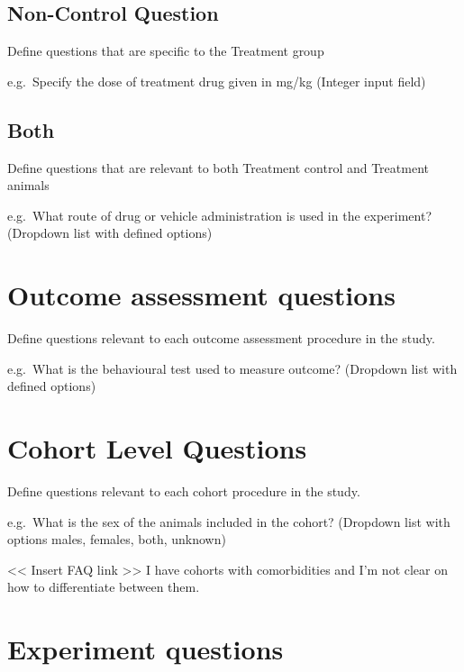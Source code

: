 \documentclass[
]{book}
\begin{document}
\hypertarget{non-control-question-1}{%
\subsection{Non-Control Question}\label{non-control-question-1}}

Define questions that are specific to the Treatment group

e.g.~Specify the dose of treatment drug given in mg/kg
(Integer input field)

\hypertarget{both-1}{%
\subsection{Both}\label{both-1}}

Define questions that are relevant to both Treatment control and Treatment animals

e.g.~What route of drug or vehicle administration is used in the experiment?
(Dropdown list with defined options)

\hypertarget{outcome-assessment-questions}{%
\section{Outcome assessment questions}\label{outcome-assessment-questions}}

Define questions relevant to each outcome assessment procedure in the study.

e.g.~What is the behavioural test used to measure outcome?
(Dropdown list with defined options)

\hypertarget{cohort-level-questions}{%
\section{Cohort Level Questions}\label{cohort-level-questions}}

Define questions relevant to each cohort procedure in the study.

e.g.~What is the sex of the animals included in the cohort?
(Dropdown list with options males, females, both, unknown)

\textless{}\textless{} Insert FAQ link \textgreater{}\textgreater{}
I have cohorts with comorbidities and I'm not clear on how to differentiate between them.

\hypertarget{experiment-questions}{%
\section{Experiment questions}\label{experiment-questions}}
\end{document}
